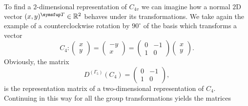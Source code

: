 To find a $2$-dimensional representation of $C_{4v}$ we can imagine how a normal $2$D vector $(x,y)^\trans\in\mathbb{R}^2$ behaves under its transformations.
We take again the example of a counterclockwise rotation by $90^\circ$ of the basis which transforms a vector
\begin{equation}
    \label{eq:Group:Symm:C4transform}
    C_4:\begin{pmatrix}
        x\\
        y
    \end{pmatrix} = 
    \begin{pmatrix}
        -y\\
        x
    \end{pmatrix} = 
    \begin{pmatrix}
        0 & -1\\
        1 & 0
    \end{pmatrix}
    \begin{pmatrix}
        x\\
        y
    \end{pmatrix}.
\end{equation}
Obviously, the matrix 
\begin{equation}
    \label{eq:Group:Symm:C4G5D}
    D^{(\Gamma_5)}(C_4) = 
    \begin{pmatrix}
        0 & -1\\
        1 & 0
    \end{pmatrix},
\end{equation}
is the representation matrix of a two-dimensional representation of $C_4$. Continuing in this way for all the group transformations yields the matrices
